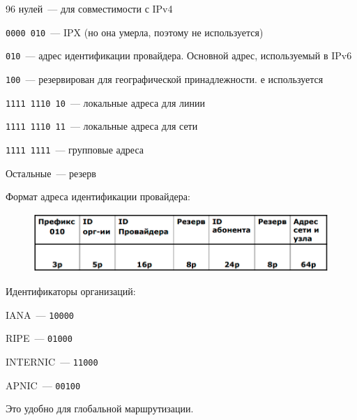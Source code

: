 \begin{MyItemize}
    \item 96 нулей~--- для совместимости с IPv4
    \item {\tt 0000 010}~--- IPX (но она умерла, поэтому не используется)
    \item {\tt 010}~--- адрес идентификации провайдера. Основной адрес, используемый в IPv6
    \item {\tt 100}~--- резервирован для географической принадлежности. е используется
    \item {\tt 1111 1110 10}~--- локальные адреса для линии
    \item {\tt 1111 1110 11}~--- локальные адреса для сети
    \item {\tt 1111 1111}~--- групповые адреса
    \item Остальные~--- резерв
\end{MyItemize}

Формат адреса идентификации провайдера:

\begin{figure}[H]
  \centering
  \includegraphics[width=15cm]{images/08/02}
\end{figure}

Идентификаторы организаций:
\begin{MyItemize}
    \item IANA~--- {\tt 10000}
    \item RIPE~--- {\tt 01000}
    \item INTERNIC~--- {\tt 11000}
    \item APNIC~--- {\tt 00100}
\end{MyItemize}

Это удобно для глобальной маршрутизации.

